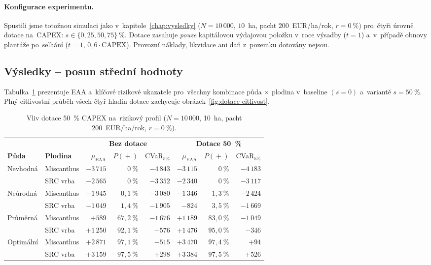 \paragraph{Konfigurace experimentu.}
Spustili jsme totožnou simulaci jako v~kapitole~\ref{chap:vysledky}
(${N = 10\,000}$, $10$~ha, pacht $200$~EUR/ha/rok, $r = 0~\%$) pro~čtyři
úrovně dotace na~CAPEX: \(s \in \{0, 25, 50, 75\}~\%\). Dotace zasahuje
\emph{pouze} kapitálovou výdajovou položku v~roce výsadby
(\(t = 1\)) a~v~případě obnovy plantáže po~selhání
($t = 1$, $0{,}6 \cdot \mathrm{CAPEX}$). Provozní náklady,
likvidace ani daň z~pozemku dotovány nejsou.

\subsection{Výsledky -- posun střední hodnoty}
\label{subsec:dotace-mean}

Tabulka~\ref{tab:dotace-shrnuti} prezentuje EAA a~klíčové rizikové
ukazatele pro~všechny kombinace půda \(\times\) plodina v~baseline
\((s = 0)\) a~variantě \(s = 50~\%\). Plný citlivostní průběh všech
čtyř hladin dotace zachycuje obrázek~\ref{fig:dotace-citlivost}.

\begin{table}[H]
\centering
\caption{Vliv dotace 50~\% CAPEX na~rizikový profil
(\(N = 10\,000\), 10~ha, pacht 200~EUR/ha/rok, \(r = 0~\%\)).}
\label{tab:dotace-shrnuti}
\renewcommand{\arraystretch}{1.15}
\small
\begin{tabular}{ll|rrr|rrr}
\toprule
\multicolumn{2}{c|}{} & \multicolumn{3}{c|}{\textbf{Bez dotace}} & \multicolumn{3}{c}{\textbf{Dotace 50~\%}} \\
\textbf{Půda} & \textbf{Plodina} & $\mu_{\mathrm{EAA}}$ & $P(\!+\!)$ & CVaR$_{5\%}$ & $\mu_{\mathrm{EAA}}$ & $P(\!+\!)$ & CVaR$_{5\%}$ \\
\midrule
Nevhodná   & Miscanthus & $-3\,715$ & $0~\%$    & $-4\,843$ & $-3\,115$ & $0~\%$    & $-4\,183$ \\
           & SRC vrba   & $-2\,565$ & $0~\%$    & $-3\,352$ & $-2\,340$ & $0~\%$    & $-3\,117$ \\
\midrule
Neúrodná   & Miscanthus & $-1\,945$ & $0{,}1~\%$  & $-3\,080$ & $-1\,346$ & $1{,}3~\%$  & $-2\,424$ \\
           & SRC vrba   & $-1\,049$ & $1{,}4~\%$  & $-1\,905$ & $-824$    & $3{,}5~\%$  & $-1\,669$ \\
\midrule
Průměrná   & Miscanthus & $+589$    & $67{,}2~\%$ & $-1\,676$ & $+1\,189$ & $83{,}0~\%$ & $-1\,049$ \\
           & SRC vrba   & $+1\,250$ & $92{,}1~\%$ & $-576$    & $+1\,476$ & $95{,}0~\%$ & $-346$ \\
\midrule
Optimální  & Miscanthus & $+2\,871$ & $97{,}1~\%$ & $-515$    & $+3\,470$ & $97{,}4~\%$ & $+94$ \\
           & SRC vrba   & $+3\,159$ & $97{,}5~\%$ & $+298$    & $+3\,384$ & $97{,}5~\%$ & $+526$ \\
\bottomrule
\end{tabular}
\end{table}

